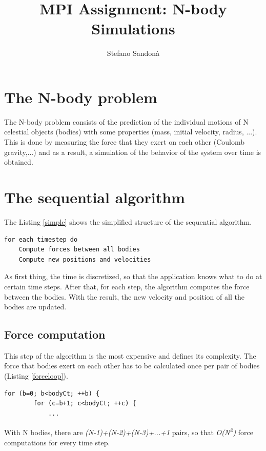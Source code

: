 \documentclass[a4paper]{article}
\begin{document}
\title{MPI Assignment: N-body Simulations}
\author{Stefano Sandonà}
\date{}
		
\maketitle

\section{The N-body problem}
\label{sec:nbody_problem}
The N-body problem consists of the prediction of the individual motions of N celestial objects (bodies) with some properties (mass, initial velocity, radius, ...). This is done by measuring the force that they exert on each other (Coulomb gravity,...) and as a result, a simulation of the behavior of the system over time is obtained.  

\section{The sequential algorithm}
\label{sec:seq_algo}
The Listing \ref{simple} shows the simplified structure of the sequential algorithm.
\begin{lstlisting}[label=simple, caption=general sequential algorithm]
for each timestep do
	Compute forces between all bodies
	Compute new positions and velocities
\end{lstlisting}

As first thing, the time is discretized, so that the application knows what to do at certain time steps. After that, for each step, the algorithm computes the force between the bodies. With the result, the new velocity and position of all the bodies are updated.

\subsection{Force computation}
\label{sec:force_comp_seq}
This step of the algorithm is the most expensive and defines its complexity.
The force that bodies exert on each other has to be calculated once per pair of bodies (Listing \ref{forceloop}).
\begin{lstlisting}[label=forceloop, caption=loop for the force calculation]
for (b=0; b<bodyCt; ++b) {
		for (c=b+1; c<bodyCt; ++c) {
			...
\end{lstlisting}
With N bodies, there are \textit{(N-1)+(N-2)+(N-3)+...+1} pairs, so that \textit{O(N\textsuperscript{2})} force computations for every time step.
\end{document}
